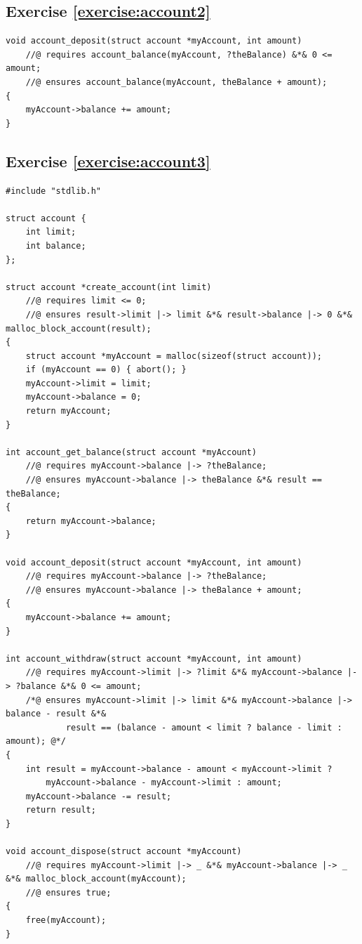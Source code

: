 \documentclass{article}
\begin{document}
\subsection{Exercise \ref{exercise:account2}}

\begin{lstlisting}
void account_deposit(struct account *myAccount, int amount)
    //@ requires account_balance(myAccount, ?theBalance) &*& 0 <= amount;
    //@ ensures account_balance(myAccount, theBalance + amount);
{
    myAccount->balance += amount;
}
\end{lstlisting}

\subsection{Exercise \ref{exercise:account3}}

\begin{lstlisting}
#include "stdlib.h"

struct account {
    int limit;
    int balance;
};

struct account *create_account(int limit)
    //@ requires limit <= 0;
    //@ ensures result->limit |-> limit &*& result->balance |-> 0 &*& malloc_block_account(result);
{
    struct account *myAccount = malloc(sizeof(struct account));
    if (myAccount == 0) { abort(); }
    myAccount->limit = limit;
    myAccount->balance = 0;
    return myAccount;
}

int account_get_balance(struct account *myAccount)
    //@ requires myAccount->balance |-> ?theBalance;
    //@ ensures myAccount->balance |-> theBalance &*& result == theBalance;
{
    return myAccount->balance;
}

void account_deposit(struct account *myAccount, int amount)
    //@ requires myAccount->balance |-> ?theBalance;
    //@ ensures myAccount->balance |-> theBalance + amount;
{
    myAccount->balance += amount;
}

int account_withdraw(struct account *myAccount, int amount)
    //@ requires myAccount->limit |-> ?limit &*& myAccount->balance |-> ?balance &*& 0 <= amount;
    /*@ ensures myAccount->limit |-> limit &*& myAccount->balance |-> balance - result &*&
            result == (balance - amount < limit ? balance - limit : amount); @*/
{
    int result = myAccount->balance - amount < myAccount->limit ?
        myAccount->balance - myAccount->limit : amount;
    myAccount->balance -= result;
    return result;
}

void account_dispose(struct account *myAccount)
    //@ requires myAccount->limit |-> _ &*& myAccount->balance |-> _ &*& malloc_block_account(myAccount);
    //@ ensures true;
{
    free(myAccount);
}
\end{lstlisting}
\end{document}
